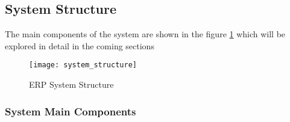 \subsection{System Structure}

The main components of the system are shown in the figure \ref{fig:system_structure} which will be explored in
detail in the coming sections

\begin{figure}
    \texttt{[image: system\_structure]}
    \centering
    \caption{ERP System Structure}
    \label{fig:system_structure}
\end{figure}


\subsubsection{System Main Components}

